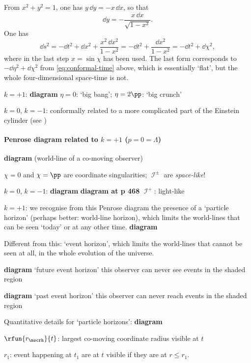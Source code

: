 From $x^2 +  y^2 = 1$, one has $y\,\dd y = -x\,\dd x$, so that
\begin{equation}
\dd y = -\frac{x\,\dd x}{\sqrt{1-x^2}}.
\end{equation}
One has
\begin{equation}
\dd s^2 = -\dd t^2 + \dd x^2 + \frac{x^2\,\dd x^2}{1-x^2} = -\dd t^2 +
\frac{\dd x^2}{1-x^2} = -\dd t^2 + \dd \chi^2,
\end{equation}
where in the last step $x = \sin\chi$ has been used. The last form corresponds 
to $-\dd \eta^2 + \dd\chi^2$ from \cref{eq:conformal-time} above, which is 
essentially `flat', but the whole four-dimensional space-time is not.

$k = +1$: \textbf{diagram} $\eta = 0$: `big bang'; $\eta = 2\pp$: `big crunch'

$k = 0$, $k = -1$: conformally related to a more complicated part of the 
Einstein cylinder (see \cite{Hawking1973})

\paragraph{Penrose diagram related to $k = +1$ ($p = 0 = \Lambda$)}

\textbf{diagram} (world-line of a co-moving observer)

$\chi = 0$ and $\chi = \pp$ are coordinate singularities; $\mscrI^\pm$ are 
\emph{space-like}!

$k = 0$, $k = -1$: \textbf{diagram} \textbf{diagram at p 468} $\mscrI^+$: 
light-like

$k = +1$: we recognise from this Penrose diagram the presence of a `particle 
horizon' (perhaps better: world-line horizon), which limits the world-lines 
that can be seen `today' or at any other time. \textbf{diagram}

Different from this: `event horizon', which limits the world-lines that cannot 
be seen at all, in the whole evolution of the universe.

\textbf{diagram} `future event horizon' this observer can never see events in 
the shaded region

\textbf{diagram} `past event horizon' this observer can never reach events in 
the shaded region

Quantitative details for `particle horizons': \textbf{diagram}

$\rfun{r_\mscrh}{t}$: largest co-moving coordinate radius visible at $t$

$r_1$: event happening at $t_1$ are at $t$ visible if they are at $r \le r_1$.


